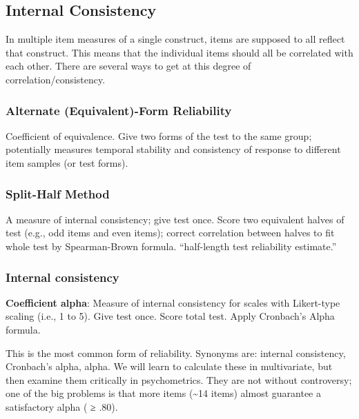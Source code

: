 \documentclass[
  english,
]{book}
\begin{document}
\hypertarget{internal-consistency}{%
\subsection{Internal Consistency}\label{internal-consistency}}

In multiple item measures of a single construct, items are supposed to all reflect that construct. This means that the individual items should all be correlated with each other. There are several ways to get at this degree of correlation/consistency.

\hypertarget{alternate-equivalent-form-reliability}{%
\subsubsection{Alternate (Equivalent)-Form Reliability}\label{alternate-equivalent-form-reliability}}

Coefficient of equivalence. Give two forms of the test to the same group; potentially measures temporal stability and consistency of response to different item samples (or test forms).

\hypertarget{split-half-method}{%
\subsubsection{Split-Half Method}\label{split-half-method}}

A measure of internal consistency; give test once. Score two equivalent halves of test (e.g., odd items and even items); correct correlation between halves to fit whole test by Spearman-Brown formula.
``half-length test reliability estimate.''

\hypertarget{internal-consistency-1}{%
\subsubsection{Internal consistency}\label{internal-consistency-1}}

\textbf{Coefficient alpha}: Measure of internal consistency for scales with Likert-type scaling (i.e., 1 to 5). Give test once. Score total test. Apply Cronbach's Alpha formula.

This is the most common form of reliability. Synonyms are: internal consistency, Cronbach's alpha, alpha. We will learn to calculate these in multivariate, but then examine them critically in psychometrics. They are not without controversy; one of the big problems is that more items (\textasciitilde14 items) almost guarantee a satisfactory alpha ( ≥ .80).
\end{document}
